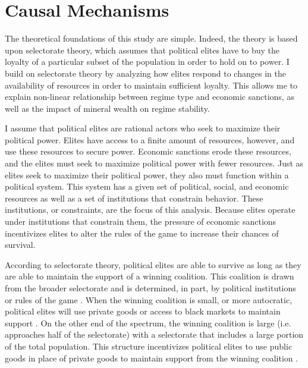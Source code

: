 \documentclass[a4paper]{article}\usepackage[]{graphicx}\usepackage[]{color}
\begin{document}
\section*{\large{Causal Mechanisms}}
The theoretical foundations of this study are simple. Indeed, the theory is based upon selectorate theory, which assumes that political elites have to buy the loyalty of a particular subset of the population in order to hold on to power.  I build on selectorate theory by analyzing how elites respond to changes in the availability of resources in order to maintain sufficient loyalty.  This allows me to explain non-linear relationship between regime type and economic sanctions, as well as the impact of mineral wealth on regime stability.
\par
I assume that political elites are rational actors who seek to maximize their political power. Elites have access to a finite amount of resources, however, and use these resources to secure power. Economic sanctions erode these resources, and the elites must seek to maximize political power with fewer resources. Just as elites seek to maximize their political power, they also must function within a political system. This system has a given set of political, social, and economic resources as well as a set of institutions that constrain behavior. These institutions, or constraints, are the focus of this analysis. Because elites operate under institutions that constrain them, the pressure of economic sanctions incentivizes elites to alter the rules of the game to increase their chances of survival.  
\par
According to selectorate theory, political elites are able to survive as long as they are able to maintain the support of a winning coalition. This coalition is drawn from the broader selectorate and is determined, in part, by political institutions or rules of the game \citep{smith2005logic}. When the winning coalition is small, or more autocratic, political elites will use private goods or access to black markets to maintain support \citet[pg. 208-209]{smith2005logic}. On the other end of the spectrum, the winning coalition is large (i.e. approaches half of the selectorate) with a selectorate that includes a large portion of the total population. This structure incentivizes political elites to use public goods in place of private goods to maintain support from the winning coalition \citet[pg. 209]{smith2005logic}.
\par
\end{document}
